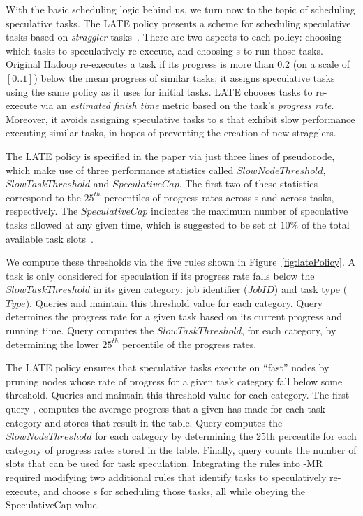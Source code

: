 With the basic scheduling logic behind us, we turn now to the topic of
scheduling speculative tasks.  The LATE policy presents a scheme for scheduling
speculative tasks based on {\em straggler} tasks~\cite{zaharia-late}.  There
are two aspects to each policy: choosing which tasks to speculatively
re-execute, and choosing {\TT}s to run those tasks.  Original Hadoop
re-executes a task if its progress is more than 0.2 (on a scale of $[0..1]$)
below the mean progress of similar tasks; it assigns speculative tasks using
the same policy as it uses for initial tasks.  LATE chooses tasks to re-execute
via an {\em estimated finish time} metric based on the task's \emph{progress
rate}.  Moreover, it avoids assigning speculative tasks to {\TT}s that exhibit
slow performance executing similar tasks, in hopes of preventing the creation
of new stragglers.

The LATE policy is specified in the paper via just three lines of pseudocode,
which make use of three performance statistics called $SlowNodeThreshold$,
$SlowTaskThreshold$ and $SpeculativeCap$.  The first two of these statistics
correspond to the $25^{th}$ percentiles of progress rates across {\TT}s and
across tasks, respectively.  The $SpeculativeCap$ indicates the maximum number
of speculative tasks allowed at any given time, which is suggested to be set at
$10\%$ of the total available task slots~\cite{zaharia-late}.

We compute these thresholds via the five \OVERLOG rules shown in
Figure~\ref{fig:latePolicy}.  A task is only considered for speculation if its
progress rate falls below the $SlowTaskThreshold$ in its given category: job
identifier ($JobID$) and task type ($Type$).  Queries  and 
maintain this threshold value for each category.  Query  determines the
progress rate for a given task based on its current progress and running time.
Query  computes the $SlowTaskThreshold$, for each category, by
determining the lower $25^{th}$ percentile of the progress rates.

The LATE policy ensures that speculative tasks execute on ``fast'' nodes by
pruning \TT nodes whose rate of progress for a given task category fall below
some threshold.  Queries  and  maintain this threshold value for
each category.  The first query , computes the average progress that a
given \TT has made for each task category and stores that result in the
 table.  Query  computes the $SlowNodeThreshold$ for each
category by determining the 25th percentile for each category of progress rates
stored in the  table.  Finally, query  counts the number
of slots that can be used for task speculation.  Integrating the rules into
\BOOM-MR required modifying two additional \OVERLOG rules that identify tasks
to speculatively re-execute, and choose {\TT}s for scheduling those tasks, all
while obeying the SpeculativeCap value.

